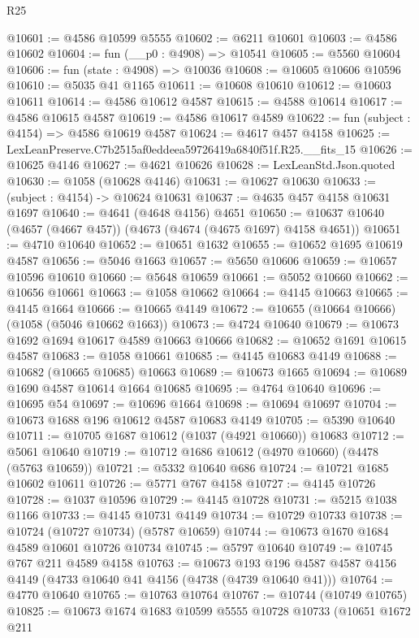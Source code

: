 \begin{lexlean}{R25}
\begin{coremodule}
@10601 := @4586 @10599 @5555
@10602 := @6211 @10601
@10603 := @4586 @10602
@10604 := fun (__p0 : @4908) => @10541
@10605 := @5560 @10604
@10606 := fun (state : @4908) => @10036
@10608 := @10605 @10606 @10596
@10610 := @5035 @41 @1165
@10611 := @10608 @10610
@10612 := @10603 @10611
@10614 := @4586 @10612 @4587
@10615 := @4588 @10614
@10617 := @4586 @10615 @4587
@10619 := @4586 @10617 @4589
@10622 := fun (subject : @4154) => @4586 @10619 @4587
@10624 := @4617 @457 @4158
@10625 := LexLeanPreserve.C7b2515af0eddeea59726419a6840f51f.R25.__fits_15
@10626 := @10625 @4146
@10627 := @4621 @10626
@10628 := LexLeanStd.Json.quoted
@10630 := @1058 (@10628 @4146)
@10631 := @10627 @10630
@10633 := (subject : @4154) -> @10624 @10631
@10637 := @4635 @457 @4158 @10631 @1697
@10640 := @4641 (@4648 @4156) @4651
@10650 := @10637 @10640 (@4657 (@4667 @457)) (@4673 (@4674 (@4675 @1697) @4158 @4651))
@10651 := @4710 @10640
@10652 := @10651 @1632
@10655 := @10652 @1695 @10619 @4587
@10656 := @5046 @1663
@10657 := @5650 @10606
@10659 := @10657 @10596 @10610
@10660 := @5648 @10659
@10661 := @5052 @10660
@10662 := @10656 @10661
@10663 := @1058 @10662
@10664 := @4145 @10663
@10665 := @4145 @1664
@10666 := @10665 @4149
@10672 := @10655 (@10664 @10666) (@1058 (@5046 @10662 @1663))
@10673 := @4724 @10640
@10679 := @10673 @1692 @1694 @10617 @4589 @10663 @10666
@10682 := @10652 @1691 @10615 @4587
@10683 := @1058 @10661
@10685 := @4145 @10683 @4149
@10688 := @10682 (@10665 @10685) @10663
@10689 := @10673 @1665
@10694 := @10689 @1690 @4587 @10614 @1664 @10685
@10695 := @4764 @10640
@10696 := @10695 @54
@10697 := @10696 @1664
@10698 := @10694 @10697
@10704 := @10673 @1688 @196 @10612 @4587 @10683 @4149
@10705 := @5390 @10640
@10711 := @10705 @1687 @10612 (@1037 (@4921 @10660)) @10683
@10712 := @5061 @10640
@10719 := @10712 @1686 @10612 (@4970 @10660) (@4478 (@5763 @10659))
@10721 := @5332 @10640 @686
@10724 := @10721 @1685 @10602 @10611
@10726 := @5771 @767 @4158
@10727 := @4145 @10726
@10728 := @1037 @10596
@10729 := @4145 @10728
@10731 := @5215 @1038 @1166
@10733 := @4145 @10731 @4149
@10734 := @10729 @10733
@10738 := @10724 (@10727 @10734) (@5787 @10659)
@10744 := @10673 @1670 @1684 @4589 @10601 @10726 @10734
@10745 := @5797 @10640
@10749 := @10745 @767 @211 @4589 @4158
@10763 := @10673
    @193
    @196
    @4587
    @4587
    @4156
    @4149
    (@4733 @10640 @41 @4156 (@4738 (@4739 @10640 @41)))
@10764 := @4770 @10640
@10765 := @10763 @10764
@10767 := @10744 (@10749 @10765)
@10825 := @10673
    @1674
    @1683
    @10599
    @5555
    @10728
    @10733
    (@10651
      @1672
      @211

\end{coremodule}
\end{lexlean}

